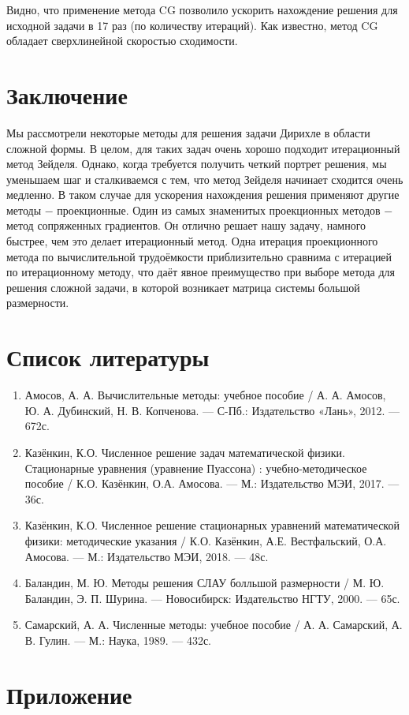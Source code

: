 \documentclass[a4paper, 12pt]{article} %
\begin{document}
Видно, что применение метода CG позволило ускорить нахождение решения для исходной задачи в 17 раз (по количеству итераций). Как известно, метод CG обладает сверхлинейной скоростью сходимости.

\section{Заключение}

Мы рассмотрели некоторые методы для решения задачи Дирихле в области сложной формы. В целом, для таких задач очень хорошо подходит итерационный метод Зейделя. Однако, когда требуется получить четкий портрет решения, мы уменьшаем шаг и сталкиваемся с тем, что метод Зейделя начинает сходится очень медленно. В таком случае для ускорения нахождения решения применяют другие методы $ - $ проекционные. Один из самых знаменитых проекционных методов $ - $ метод сопряженных градиентов. Он отлично решает нашу задачу, намного быстрее, чем это делает итерационный метод. Одна итерация проекционного метода по вычислительной трудоёмкости приблизительно сравнима с итерацией по итерационному методу, что даёт явное преимущество при выборе метода для решения сложной задачи, в которой возникает матрица системы большой размерности.   

\newpage

\section{Список литературы}

\begin{enumerate}

\item
Амосов, А. А. Вычислительные методы: учебное пособие / А. А. Амосов, Ю. А. Дубинский, Н. В. Копченова. — С-Пб.: Издательство «Лань», 2012. — 672с.

\item 
Казёнкин, К.О. Численное решение задач математической физики. Стационарные уравнения (уравнение Пуассона) : учебно-методическое пособие / К.О. Казёнкин, О.А. Амосова. — М.: Издательство МЭИ, 2017. — 36с.

\item
Казёнкин, К.О. Численное решение стационарных уравнений математической физики: методические указания / К.О. Казёнкин, А.Е. Вестфальский, О.А. Амосова. — М.: Издательство МЭИ, 2018. — 48с.

\item
Баландин, М. Ю. Методы решения СЛАУ болльшой размерности / М. Ю. Баландин, Э. П. Шурина. — Новосибирск: Издательство НГТУ, 2000. — 65с.

\item
Самарский, А. А. Численные методы: учебное пособие / А. А. Самарский, А. В. Гулин. — М.: Наука, 1989. — 432с.

\end{enumerate}

\newpage

\section{Приложение}
\end{document}
